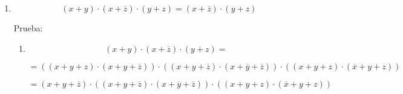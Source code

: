 \documentclass[
]{article}
\begin{document}
\begin{enumerate}
\begin{enumerate}
\begin{enumerate}
\begin{enumerate}
        Prueba:

        \begin{enumerate}
        \def\labelenumv{\arabic{enumv}.}
        \item
          \[{{\left( {x \cdot y} \right) + \left( {x \cdot \overline{z}} \right)} + \left( {y \cdot z} \right)} =\]

          \[= {{\left( {\left( {{x \cdot y} \cdot z} \right) + \left( {{x \cdot y} \cdot \overline{z}} \right)} \right) + \left( {\left( {{x \cdot y} \cdot \overline{z}} \right) + \left( {{x \cdot \overline{y}} \cdot \overline{z}} \right)} \right)} + \left( {\left( {{x \cdot y} \cdot z} \right) + \left( {{\overline{x} \cdot y} \cdot z} \right)} \right)}\]

          \[= {{\left( {{x \cdot y} \cdot \overline{z}} \right) + \left( {\left( {{x \cdot y} \cdot \overline{z}} \right) + \left( {{x \cdot \overline{y}} \cdot \overline{z}} \right)} \right)} + \left( {\left( {{x \cdot y} \cdot z} \right) + \left( {{\overline{x} \cdot y} \cdot z} \right)} \right)}\]

          \[= {\left( {\left( {{x \cdot y} \cdot \overline{z}} \right) + \left( {{x \cdot \overline{y}} \cdot \overline{z}} \right)} \right) + \left( {\left( {{x \cdot y} \cdot z} \right) + \left( {{\overline{x} \cdot y} \cdot z} \right)} \right)}\]

          \[= {\left( {x \cdot \overline{z}} \right) + \left( {y \cdot z} \right)}\]
        \end{enumerate}
      \item
        \[{{\left( {x + y} \right) \cdot \left( {x + \overline{z}} \right)} \cdot \left( {y + z} \right)} = {\left( {x + \overline{z}} \right) \cdot \left( {y + z} \right)}\]

        Prueba:

        \begin{enumerate}
        \def\labelenumv{\arabic{enumv}.}
        \item
          \[{{\left( {x + y} \right) \cdot \left( {x + \overline{z}} \right)} \cdot \left( {y + z} \right)} =\]

          \[= {{\left( {\left( {{x + y} + z} \right) \cdot \left( {{x + y} + \overline{z}} \right)} \right) \cdot \left( {\left( {{x + y} + \overline{z}} \right) \cdot \left( {{x + \overline{y}} + \overline{z}} \right)} \right)} \cdot \left( {\left( {{x + y} + z} \right) \cdot \left( {{\overline{x} + y} + z} \right)} \right)}\]

          \[= {{\left( {{x + y} + \overline{z}} \right) \cdot \left( {\left( {{x + y} + \overline{z}} \right) \cdot \left( {{x + \overline{y}} + \overline{z}} \right)} \right)} \cdot \left( {\left( {{x + y} + z} \right) \cdot \left( {{\overline{x} + y} + z} \right)} \right)}\]


\end{enumerate}
\end{enumerate}
\end{enumerate}
\end{enumerate}
\end{enumerate}
\end{document}
